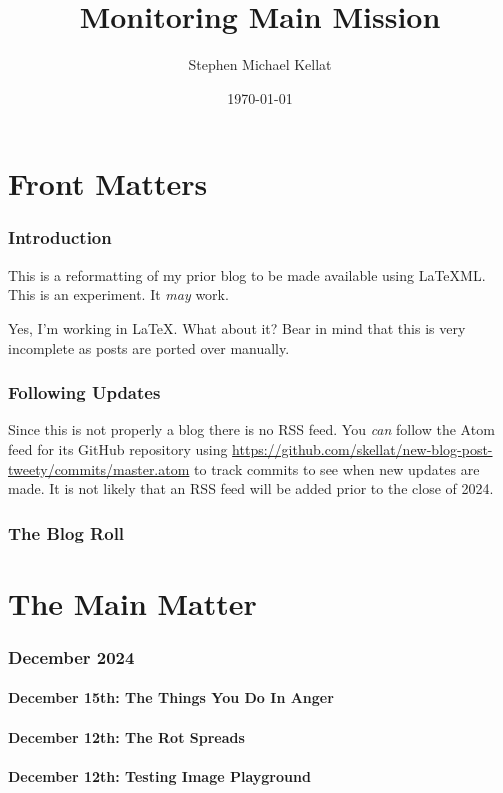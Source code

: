\documentclass[12pt,letterpaper]{report}
\title{Monitoring Main Mission}
\author{Stephen Michael Kellat}
\date{\today}
\begin{document}
\maketitle
\tableofcontents
\part{Front Matters}
\section{Introduction}
This is a reformatting of my prior blog to be made available using LaTeXML.  This is an experiment.  It \emph{may} work.  

Yes, I'm working in \LaTeX.  What about it?  Bear in mind that this is very incomplete as posts are ported over manually.
\section{Following Updates}
Since this is not properly a blog there is no RSS feed.  You \emph{can} follow the Atom feed for its GitHub repository using \url{https://github.com/skellat/new-blog-post-tweety/commits/master.atom} to track commits to see when new updates are made.  It is not likely that an RSS feed will be added prior to the close of 2024.
\section{The Blog Roll}

\part{The Main Matter}
\section{December 2024}
\subsection{December 15th: The Things You Do In Anger}


\subsection{December 12th: The Rot Spreads}

\subsection{December 12th: Testing Image Playground}

\end{document}
